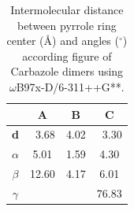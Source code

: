 		
		\begin{table}[H]
			\caption{Intermolecular distance between pyrrole ring center (Å) and angles ($^{\circ}$) according figure  of  Carbazole dimers using $\omega$B97x-D/6-311++G**.}
			\begin{center}
				\begin{tabular}{c c c c}
					\hline
					& \multicolumn{1}{c}{\textbf{A}} & \multicolumn{1}{c}{\textbf{B}} & \multicolumn{1}{c}{\textbf{C}} \\ \hline
					\textbf{d} & \multicolumn{1}{r}{3.68} & \multicolumn{1}{r}{4.02} & \multicolumn{1}{r}{3.30} \\ 
					\textbf{$\alpha$}& 5.01 & 1.59 & 4.30 \\ 
					\textbf{$\beta$} & 12.60 & 4.17 &6.01 \\ 
					\textbf{$\gamma$} & \multicolumn{1}{c}{} & \multicolumn{1}{c}{} & \multicolumn{1}{c}{76.83} \\ \hline
				\end{tabular}
			\end{center}
			\label{}
		\end{table}
		
